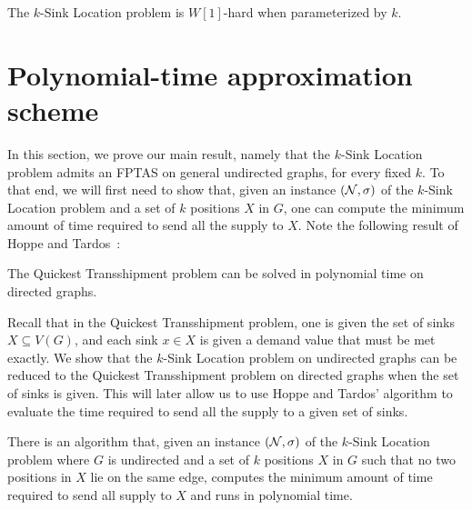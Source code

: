 \documentclass[a4paper,10pt]{llncs}
\begin{document}
\begin{theorem}
\label{thm:W-hard}
The $k$-{\sc Sink Location} problem is $W[1]$-hard when parameterized by $k$. 
\end{theorem}

\section{Polynomial-time approximation scheme}

In this section, we prove our main result, namely that the $k$-{\sc Sink Location} problem admits an FPTAS on general undirected graphs, for every fixed $k$. To that end, we will first need to show that, given an instance $({\cal N}, \sigma)$ of the $k$-{\sc Sink Location} problem and a set of $k$ positions $X$ in $G$, one can compute the minimum amount of time required to send all the supply to $X$. Note the following result of Hoppe and Tardos~\cite{HT00}:
\begin{theorem}[\cite{HT00}]
The {\sc Quickest Transshipment} problem can be solved in polynomial time on directed graphs.
\end{theorem}
Recall that in the {\sc Quickest Transshipment} problem, one is given the set of sinks $X\subseteq V(G)$, and each sink $x\in X$ is given a demand value that must be met exactly. We show that the $k$-{\sc Sink Location} problem on undirected graphs can be reduced to the {\sc Quickest Transshipment} problem on directed graphs when the set of sinks is given. This will later allow us to use Hoppe and Tardos' algorithm to evaluate the time required to send all the supply to a given set of sinks.

\begin{lemma}
\label{lem:reduction}
There is an algorithm that, given an instance $({\cal N}, \sigma)$ of the $k$-{\sc Sink Location} problem where $G$ is undirected and a set of $k$ positions $X$ in $G$ such that no two positions in $X$ lie on the same edge, computes the minimum amount of time required to send all supply to $X$ and runs in polynomial time.
\end{lemma}
\end{document}
